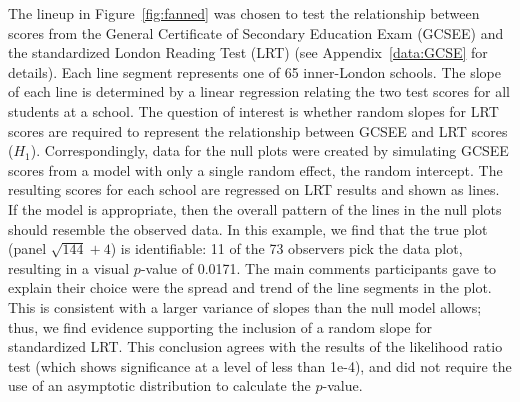 \documentclass[12pt]{article} %
\newcommand{\hh}[1]{{\color{orange} #1}}
\newcommand{\al}[1]{{\color{ForestGreen} #1}}
\newcommand{\alnote}[1]{\todo[inline,color=green!40]{#1}} %
\begin{document}
The lineup in Figure~\ref{fig:fanned} was chosen to test the relationship between scores from the General Certificate of Secondary Education Exam (GCSEE) and the  standardized London Reading Test (LRT) (see Appendix~\ref{data:GCSE} for details).  Each line segment represents one of 65 inner-London schools. The slope of each line is determined by a linear regression relating the two test scores for all students at a school. 
The question of interest is whether random slopes for LRT scores are required to  represent the relationship between GCSEE and LRT scores ($H_1$). Correspondingly, data for the null plots  were  created by simulating GCSEE scores from a model with only a single random effect, the random intercept.
The resulting scores for each school are regressed on LRT results and shown as lines.
 If the model is appropriate, then the overall pattern of the lines in the null plots should resemble the observed data. In this example, we find that the true plot (panel $\sqrt{144} + 4$) is identifiable:  11 of the 73 observers pick the data plot, resulting in a visual $p$-value of 0.0171. The main comments participants gave to explain their choice were the spread and trend of the line segments in the plot. This is consistent with a larger variance of slopes than the null model allows;
  thus, we find evidence supporting the inclusion of a random slope for standardized LRT. This conclusion agrees with the results of the likelihood ratio test (which shows significance at a level of less than 1e-4), and did not require the use of an asymptotic distribution to calculate the $p$-value. 
  
\end{document}
